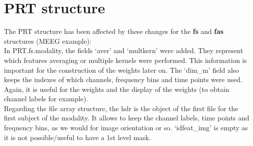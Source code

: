 
\section{PRT structure}

The PRT structure has been affected by these changes for the \textbf{fs} and \textbf{fas} structures (MEEG example):
\\





In PRT.fs.modality, the fields `aver' and `multkern' were added. They represent which features averaging or multiple kernels were performed. This information is important for the construction of the weights later on. The `dim\_m' field also keeps the indexes of which channels, frequency bins and time points were used. Again, it is useful for the weights and the display of the weights (to obtain channel labels for example).
\\

Regarding the file array structure, the hdr is the object of the first file for the first subject of the modality. It allows to keep the channel labels, time points and frequency bins, as we would for image orientation or so. `idfeat\_img' is empty as it is not possible/useful to have a 1st level mask.
\\





